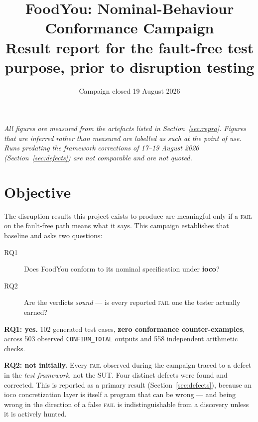 \documentclass[11pt,a4paper]{article}
\title{\vspace{-1.5em}\textbf{FoodYou: Nominal-Behaviour Conformance Campaign}\\[0.3em]
\large Result report for the fault-free test purpose, prior to disruption testing}
\author{}
\date{Campaign closed 19 August 2026}
\newcommand{\gate}[1]{\texttt{\small #1}}
\begin{document}
\maketitle
\vspace{-2.5em}

\begin{center}
\begin{minipage}{0.93\textwidth}
\small\itshape
All figures are measured from the artefacts listed in Section~\ref{sec:repro}.
Figures that are inferred rather than measured are labelled as such at the point
of use. Runs predating the framework corrections of 17--19 August 2026
(Section~\ref{sec:defects}) are not comparable and are not quoted.
\end{minipage}
\end{center}

\vspace{0.8em}

\section{Objective}

The disruption results this project exists to produce are meaningful only if a
\textsc{fail} on the fault-free path means what it says. This campaign establishes
that baseline and asks two questions:

\begin{description}
  \item[RQ1] Does FoodYou conform to its nominal specification under \textbf{ioco}?
  \item[RQ2] Are the verdicts \emph{sound} --- is every reported \textsc{fail} one
        the tester actually earned?
\end{description}

\noindent\textbf{RQ1: yes.} 102 generated test cases, \textbf{zero conformance
counter-examples}, across 503 observed \gate{CONFIRM\_TOTAL} outputs and 558
independent arithmetic checks.

\noindent\textbf{RQ2: not initially.} Every \textsc{fail} observed during the
campaign traced to a defect in the \emph{test framework}, not the SUT. Four
distinct defects were found and corrected. This is reported as a primary result
(Section~\ref{sec:defects}), because an ioco concretization layer is itself a
program that can be wrong --- and being wrong in the direction of a false
\textsc{fail} is indistinguishable from a discovery unless it is actively hunted.
\end{document}
